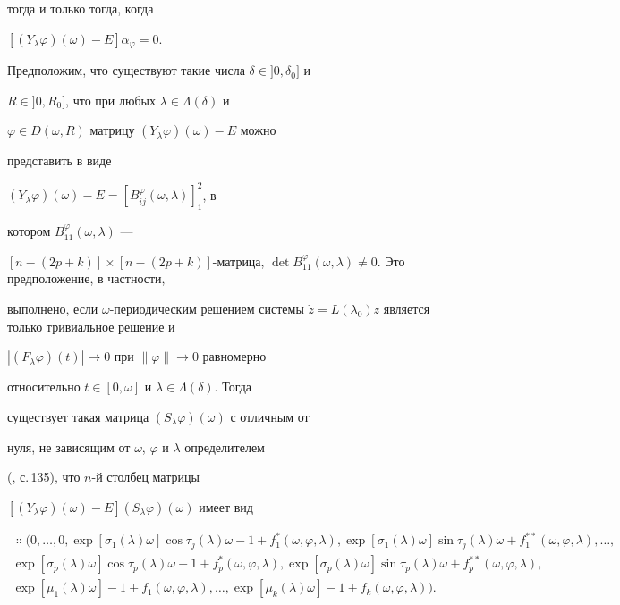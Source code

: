 тогда и только тогда, когда 


$[(Y_\lambda\varphi)(\omega)-E]\alpha_\varphi=0$. 


 


Предположим, что существуют такие числа $\delta\in]0,\delta_0]$ и 


$R\in]0,R_0]$, что при любых $\lambda\in\Lambda(\delta)$ и 


$\varphi\in D(\omega,R)$ матрицу $(Y_\lambda\varphi)(\omega)-E$ можно 


представить в виде 


$(Y_\lambda\varphi)(\omega)-E=[B^\varphi_{ij}(\omega,\lambda)]^2_1$, в 


котором $B^\varphi_{11}(\omega,\lambda)$ --- 


$[n-(2p+k)]\times[n-(2p+k)]$-матрица, $\det 


B^\varphi_{11}(\omega,\lambda)\ne 0$. Это предположение, в частности, 


выполнено, если $\omega$-периодическим решением системы $\Dot 


z=L(\lambda_0)z$ является только тривиальное решение и 


$|(F_\lambda\varphi)(t)|\to0$ при $\|\varphi\|\to 0$ равномерно 


относительно $t\in[0,\omega]$ и $\lambda\in\Lambda(\delta)$. Тогда 


существует такая матрица $(S_\lambda\varphi)(\omega)$ с отличным от 


нуля, не зависящим от $\omega$, $\varphi$ и $\lambda$ определителем 


(\cite{2}, с.\,135), что $n$-й столбец матрицы 


$[(Y_\lambda\varphi)(\omega)-E](S_\lambda\varphi)(\omega)$ имеет вид 


\begin{multline} 


\Colon(0,\dotsc,0,\exp[\sigma_1(\lambda)\omega] 


\cos\tau_j(\lambda)\omega-1+f^*_1(\omega,\varphi,\lambda), 


\exp[\sigma_1(\lambda)\omega]\sin\tau_j(\lambda)\omega+ 


f^{**}_1(\omega,\varphi,\lambda),\dotsc, \\ 


%


\exp[\sigma_p(\lambda)\omega]\cos\tau_p(\lambda)\omega-1 


+f^*_p(\omega,\varphi,\lambda), 


\exp[\sigma_p(\lambda)\omega]\sin\tau_p(\lambda)\omega+ 


f^{**}_p(\omega,\varphi,\lambda),\\ 


%


\exp[\mu_1(\lambda)\omega]-1+f_1(\omega,\varphi,\lambda),\dotsc, 


\exp[\mu_k(\lambda)\omega]-1+f_k(\omega,\varphi,\lambda)). 


\end{multline} 


